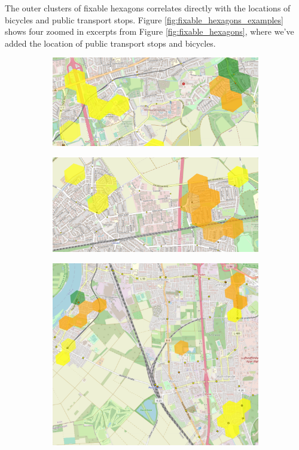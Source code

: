 The outer clusters of fixable hexagons correlates directly with the locations of bicycles and public transport stops.
Figure \ref{fig:fixable_hexagons_examples} shows four zoomed in excerpts from Figure \ref{fig:fixable_hexagons}, where we've added the location of  public transport stops and bicycles.
\begin{figure}
     \centering
     \begin{subfigure}[b]{0.45\textwidth}
         \centering
         \includegraphics[width=\textwidth]{Figures/results/problematic_hexagons/example_1.png}
     \end{subfigure}
     \hfill
     \begin{subfigure}[b]{0.45\textwidth}
         \centering
         \includegraphics[width=\textwidth]{Figures/results/problematic_hexagons/example_2.png}
     \end{subfigure}
     \hfill
     \begin{subfigure}[b]{0.45\textwidth}
         \centering
         \includegraphics[width=\textwidth]{Figures/results/problematic_hexagons/example_3.png}

\end{subfigure}
\end{figure}

